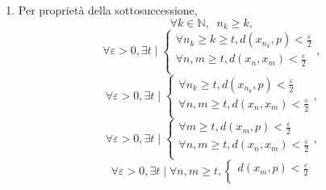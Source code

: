 \begin{demonstration}
\begin{enumerate}[label=(\roman*)]
\[\begin{cases}
            \end{cases},\]\[
            \forall\varepsilon>0,\begin{cases}
                t\geq n_\varepsilon \land t\geq k_\varepsilon \\
                \exists k_\varepsilon\mid\forall k\geq t\geq k_\varepsilon,d\left(x_{n_k},p\right)<\frac{\varepsilon}{2}\\
                \exists n_\varepsilon\mid\forall n,m\geq t\geq n_\varepsilon,d\left(x_n,x_m\right)<\frac{\varepsilon}{2}\\
            \end{cases},\]\[
            \forall\varepsilon>0,\exists t\mid\begin{cases}
                \forall k\geq t,d\left(x_{n_k},p\right)<\frac{\varepsilon}{2}\\
                \forall n,m\geq t,d\left(x_n,x_m\right)<\frac{\varepsilon}{2}\\
            \end{cases},\]\[
        \]
        \item Per proprietà della sottosuccessione,
        \[
            \forall k\in\mathbb{N},\;\;n_k \geq k,\]\[
            \forall\varepsilon>0,\exists t\mid\begin{cases}
                \forall n_k \geq k\geq t,d\left(x_{n_k},p\right)<\frac{\varepsilon}{2}\\
                \forall n,m\geq t,d\left(x_n,x_m\right)<\frac{\varepsilon}{2}\\
            \end{cases},\]\[
            \forall\varepsilon>0,\exists t\mid\begin{cases}
                \forall n_k\geq t,d\left(x_{n_k},p\right)<\frac{\varepsilon}{2}\\
                \forall n,m\geq t,d\left(x_n,x_m\right)<\frac{\varepsilon}{2}\\
            \end{cases},\]\[
            \forall\varepsilon>0,\exists t\mid\begin{cases}
                \forall m\geq t,d\left(x_m,p\right)<\frac{\varepsilon}{2}\\
                \forall n,m\geq t,d\left(x_n,x_m\right)<\frac{\varepsilon}{2}\\
            \end{cases},\]\[
            \forall\varepsilon>0,\exists t\mid\forall n,m\geq t,\begin{cases}
                d\left(x_m,p\right)<\frac{\varepsilon}{2}\\

\end{cases}\]
\end{enumerate}
\end{demonstration}
